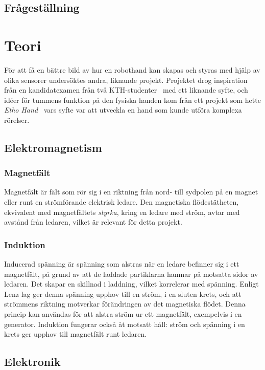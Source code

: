 \documentclass[a4paper]{article}
\begin{document}
\begin{sloppypar}
    \subsection{Frågeställning}

    \section{Teori}
    För att få en bättre bild av hur en robothand kan skapas och styras med hjälp av olika sensorer undersöktes andra, liknande projekt.
    Projektet drog inspiration från en kandidatexamen från två KTH-studenter~\cite{KTHhand} med ett liknande syfte, och
    idéer för tummens funktion på den fysiska handen kom från ett projekt som hette \textit{Etho Hand}~\cite{EthoHand}
    vars syfte var att utveckla en hand som kunde utföra komplexa rörelser.


    \subsection{Elektromagnetism}
    \subsubsection{Magnetfält}
    Magnetfält är fält som rör sig i en riktning från nord- till sydpolen på en magnet eller runt en strömförande elektrisk ledare.
    Den magnetiska flödestätheten, ekvivalent med magnetfältets \textit{styrka}, kring en ledare med ström, avtar med avstånd från ledaren,
    vilket är relevant för detta projekt.~\cite{digilar}
    \subsubsection{Induktion}
    Inducerad spänning är spänning som alstras när en ledare befinner sig i ett magnetfält, på grund av att de laddade partiklarna hamnar på motsatta sidor av ledaren.
    Det skapar en skillnad i laddning, vilket korrelerar med spänning.
    Enligt Lenz lag ger denna spänning upphov till en ström, i en sluten krets, och att strömmens riktning motverkar förändringen av det magnetiska flödet.
    Denna princip kan användas för att alstra ström ur ett magnetfält, exempelvis i en generator.
    Induktion fungerar också åt motsatt håll: ström och spänning i en krets ger upphov till magnetfält runt ledaren.
    ~\cite{digilar}

    \subsection{Elektronik}

\end{sloppypar}
\end{document}
